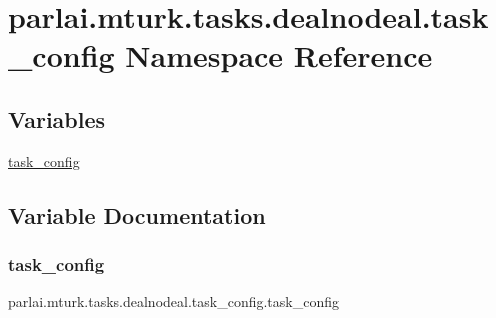\hypertarget{namespaceparlai_1_1mturk_1_1tasks_1_1dealnodeal_1_1task__config}{}\section{parlai.\+mturk.\+tasks.\+dealnodeal.\+task\+\_\+config Namespace Reference}
\label{namespaceparlai_1_1mturk_1_1tasks_1_1dealnodeal_1_1task__config}
\subsection*{Variables}
\begin{DoxyCompactItemize}
\item 
\hyperlink{namespaceparlai_1_1mturk_1_1tasks_1_1dealnodeal_1_1task__config_a7b05e490f21ab15ba70d10bbf96bd04d}{task\+\_\+config}
\end{DoxyCompactItemize}


\subsection{Variable Documentation}
\mbox{\label{namespaceparlai_1_1mturk_1_1tasks_1_1dealnodeal_1_1task__config_a7b05e490f21ab15ba70d10bbf96bd04d}} 
\subsubsection{\texorpdfstring{task\+\_\+config}{task\_config}}
{\footnotesize\ttfamily parlai.\+mturk.\+tasks.\+dealnodeal.\+task\+\_\+config.\+task\+\_\+config}

